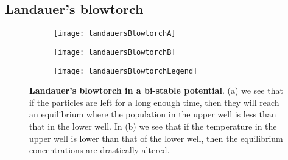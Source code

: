 \subsection{Landauer's blowtorch} \label{landauersBlowtorch}
\begin{figure}[tb]
	\begin{subfigure}{0.42\textwidth}
		\texttt{[image: landauersBlowtorchA]}
		\caption{\label{fig:landauerA}}
	\end{subfigure}
	\begin{subfigure}{0.42\textwidth}
		\texttt{[image: landauersBlowtorchB]}
		\caption{\label{fig:landauerB}}
	\end{subfigure}
	\begin{subfigure}{0.12\textwidth}
		\texttt{[image: landauersBlowtorchLegend]}
	\end{subfigure}

\caption{\textbf{Landauer's blowtorch in a bi-stable potential}. (a) we see that if the particles are left for a long enough time, then they will reach an equilibrium where the population in the upper well is less than that in the lower well. In (b) we see that if the temperature in the upper well is lower than that of the lower well, then the equilibrium concentrations are drastically altered.}
\label{fig:landauersBlowtorch}
\end{figure}
